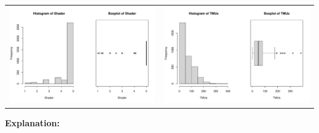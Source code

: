 \documentclass[a4paper]{article}
\theoremstyle{definition}
\begin{document}
\begin{center}
\begin{adjustbox}{width=\textwidth}
    \begin{tabular}{cc}
        \includegraphics[keepaspectratio, width=1\textwidth, height=1\textheight]{Visualization/Rplot_9.pdf}
        &\includegraphics[keepaspectratio, width=1\textwidth, height=1\textheight]{Visualization/Rplot_10.pdf}\\
    \end{tabular}
\end{adjustbox}
\end{center}
\textbf{Explanation: }
\end{document}
